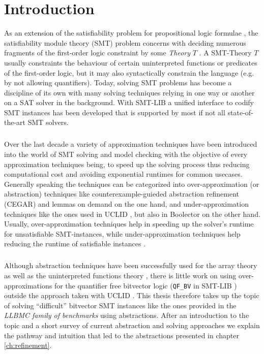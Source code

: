 \chapter{Introduction}
\label{ch:introduction}
As an extension of the satisfiability problem for propositional logic formulae \cite{Marques-Silva-PropositionalSATSolving}, the satisfiability module theory (SMT) problem concerns with deciding numerous fragments of the first-order logic constraint by some \textit{Theory} $T$ \cite{Barrett-Tinelli-SMT}.
A SMT-Theory $T$ usually constraints the behaviour of certain uninterpreted functions or predicates of the first-order logic, but it may also syntactically constrain the language (e.g. by not allowing quantifiers).
Today, solving SMT problems has become a discipline of its own with many solving techniques relying in one way or another on a SAT solver in the background.
With SMT-LIB \cite{BarFT-SMTLIB} a unified interface to codify SMT instances has been developed that is supported by most if not all state-of-the-art SMT solvers.
\paragraph{}
Over the last decade a variety of approximation techniques have been introduced into the world of SMT solving and model checking with the objective of every approximation techniques being, to speed up the solving process thus reducing computational cost and avoiding exponential runtimes for common usecases.
Generally speaking the techniques can be categorized into over-approximation (or abstraction) techniques like counterexample-guieded abstraction refinement (CEGAR) \cite{CEGAR} and lemmas on demand \cite{p6-brummayer} on the one hand, and under-approximation techniques like the ones used in UCLID \cite{Bryant2007_Chapter_DecidingBit-VectorArithmeticWi-UCLID}, but also in Boolector \cite{NiemetzPreinerBiere-JSAT15} on the other hand.
Usually, over-approximation techniques help in speeding up the solver's runtime for unsatisfiable SMT-instances, while under-approximation techniques help reducing the runtime of satisfiable instances \cite{Brummayer-PhD}. 
\paragraph{}
Although abstraction techniques have been successfully used for the array theory \cite{p6-brummayer} as well as the uninterpreted functions theory \cite{PreinerNiemetzBiere-DIFTS13,NiemetzPreinerBiere-FMCAD14}, there is little work on using over-approximations for the quantifier free bitvector logic (\texttt{QF\_BV} in SMT-LIB \cite{BarFT-SMTLIB}) outside the approach taken with UCLID \cite{Bryant2007_Chapter_DecidingBit-VectorArithmeticWi-UCLID}.
This thesis therefore takes up the topic of solving \enquote{difficult} bitvector SMT instances like the ones provided in the \textit{LLBMC family of benchmarks} \cite{sc2017-proceedings} using abstractions.
After an introduction to the topic and a short survey of current abstraction and solving approaches we explain the pathway and intuition that led to the abstractions presented in chapter \ref{ch:refinement}.

